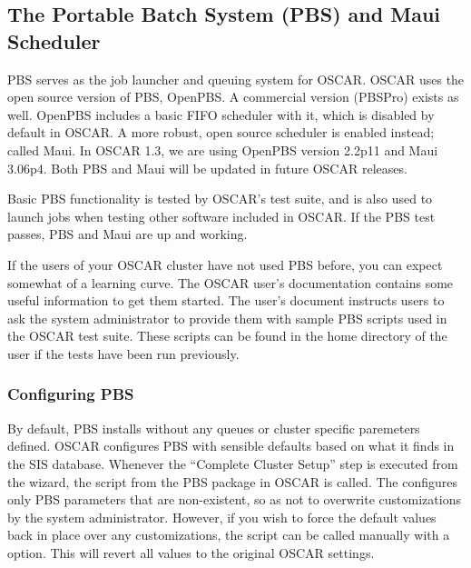 %
%
%

\subsection{The Portable Batch System (PBS) and Maui Scheduler}
\label{app:pbs-overview}

PBS serves as the job launcher and queuing system for OSCAR.  OSCAR
uses the open source version of PBS, OpenPBS.  A commercial version
(PBSPro) exists as well.  OpenPBS includes a basic FIFO scheduler with
it, which is disabled by default in OSCAR.  A more robust, open source
scheduler is enabled instead; called Maui.  In OSCAR 1.3, we are using
OpenPBS version 2.2p11 and Maui 3.06p4.  Both PBS and Maui will be
updated in future OSCAR releases.

Basic PBS functionality is tested by OSCAR's test suite, and is also
used to launch jobs when testing other software included in OSCAR.  If
the PBS test passes, PBS and Maui are up and working.  

If the users of your OSCAR cluster have not used PBS before, you can
expect somewhat of a learning curve.  The OSCAR user's documentation
contains some useful information to get them started.  The user's
document instructs users to ask the system administrator to provide
them with sample PBS scripts used in the OSCAR test suite.  These
scripts can be found in the home directory of the  user
if the tests have been run previously.

\subsubsection{Configuring PBS}

By default, PBS installs without any queues or cluster specific
paremeters defined.  OSCAR configures PBS with sensible defaults based
on what it finds in the SIS database.  Whenever the ``Complete Cluster
Setup'' step is executed from the wizard, the 
script from the PBS package in OSCAR is called.  The
 configures only PBS parameters that are
non-existent, so as not to overwrite customizations by the system
administrator.  However, if you wish to force the default values back
in place over any customizations, the  script can
be called manually with a  option.  This will revert
all values to the original OSCAR settings.

